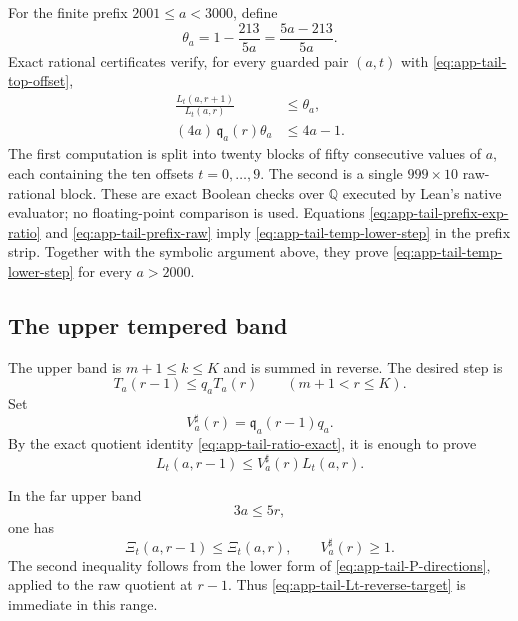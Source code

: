 \documentclass[11pt]{article}
\theoremstyle{definition}
\theoremstyle{remark}
\begin{document}
For the finite prefix $2001\le a<3000$, define
\begin{equation}\label{eq:app-tail-theta}
 \theta_a=1-\frac{213}{5a}=\frac{5a-213}{5a}.
\end{equation}
Exact rational certificates verify, for every guarded pair
$(a,t)$ with \eqref{eq:app-tail-top-offset},
\begin{align}
 \frac{L_t(a,r+1)}{L_t(a,r)}&\le\theta_a,
 \label{eq:app-tail-prefix-exp-ratio}\\
 (4a)\,\mathfrak q_a(r)\theta_a&\le4a-1.
 \label{eq:app-tail-prefix-raw}
\end{align}
The first computation is split into twenty blocks of fifty consecutive values
of $a$, each containing the ten offsets $t=0,\ldots,9$.  The second is a
single $999\times10$ raw-rational block.  These are exact Boolean checks over
$\mathbb Q$ executed by Lean's native evaluator; no floating-point comparison
is used.  Equations \eqref{eq:app-tail-prefix-exp-ratio} and
\eqref{eq:app-tail-prefix-raw} imply \eqref{eq:app-tail-temp-lower-step} in the
prefix strip.  Together with the symbolic argument above, they prove
\eqref{eq:app-tail-temp-lower-step} for every $a>2000$.

\subsection{The upper tempered band}

The upper band is $m+1\le k\le K$ and is summed in reverse.  The desired step
is
\begin{equation}\label{eq:app-tail-temp-upper-step}
 T_a(r-1)\le q_aT_a(r)
 \qquad(m+1<r\le K).
\end{equation}
Set
\begin{equation}\label{eq:app-tail-V}
 V^{\sharp}_a(r)=\mathfrak q_a(r-1)q_a.
\end{equation}
By the exact quotient identity \eqref{eq:app-tail-ratio-exact}, it is enough
to prove
\begin{equation}\label{eq:app-tail-Lt-reverse-target}
 L_t(a,r-1)\le V^{\sharp}_a(r)L_t(a,r).
\end{equation}

In the far upper band
\begin{equation}\label{eq:app-tail-far-upper}
 3a\le5r,
\end{equation}
one has
\begin{equation}\label{eq:app-tail-far-upper-two}
 \Xi_t(a,r-1)\le \Xi_t(a,r),
 \qquad V^{\sharp}_a(r)\ge1.
\end{equation}
The second inequality follows from the lower form of
\eqref{eq:app-tail-P-directions}, applied to the raw quotient at $r-1$.
Thus \eqref{eq:app-tail-Lt-reverse-target} is immediate in this range.
\end{document}
